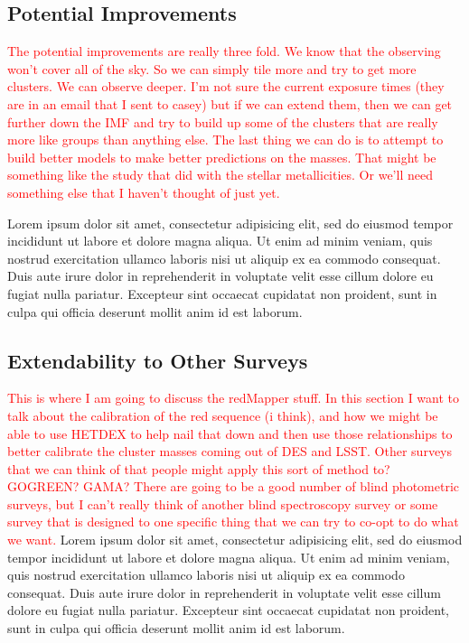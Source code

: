 \documentclass[fleqn,usenatbib]{mnras}
\newcommand{\editorial}[1]{\textcolor{red}{#1}}
\begin{document}
\subsection{Potential Improvements}
\editorial{The potential improvements are really three fold. We know that the observing won't cover all of the sky. So we can simply tile more and try to get more clusters. We can observe deeper. I'm not sure the current exposure times (they are in an email that I sent to casey) but if we can extend them, then we can get further down the IMF and try to build up some of the clusters that are really more like groups than anything else. The last thing we can do is to attempt to  build better models to make better predictions on the masses. That might be something like the study that \cite{Acquaviva2016} did with the stellar metallicities. Or we'll need something else that I haven't thought of just yet.}

Lorem ipsum dolor sit amet, consectetur adipisicing elit, sed do eiusmod tempor incididunt ut labore et dolore magna aliqua. Ut enim ad minim veniam, quis nostrud exercitation ullamco laboris nisi ut aliquip ex ea commodo consequat. Duis aute irure dolor in reprehenderit in voluptate velit esse cillum dolore eu fugiat nulla pariatur. Excepteur sint occaecat cupidatat non proident, sunt in culpa qui officia deserunt mollit anim id est laborum.

\subsection{Extendability to Other Surveys}
\editorial{This is where I am going to discuss the redMapper stuff. In this section I want to talk about the calibration of the red sequence (i think), and how we might be able to use HETDEX to help nail that down and then use those relationships to better calibrate the cluster masses coming out of DES and LSST. Other surveys that we can think of that people might apply this sort of method to? GOGREEN? GAMA? There are going to be a good number of blind photometric surveys, but I can't really think of another blind spectroscopy survey or some survey that is designed to one specific thing that we can try to co-opt to do what we want.}
Lorem ipsum dolor sit amet, consectetur adipisicing elit, sed do eiusmod tempor incididunt ut labore et dolore magna aliqua. Ut enim ad minim veniam, quis nostrud exercitation ullamco laboris nisi ut aliquip ex ea commodo consequat. Duis aute irure dolor in reprehenderit in voluptate velit esse cillum dolore eu fugiat nulla pariatur. Excepteur sint occaecat cupidatat non proident, sunt in culpa qui officia deserunt mollit anim id est laborum.
\end{document}
